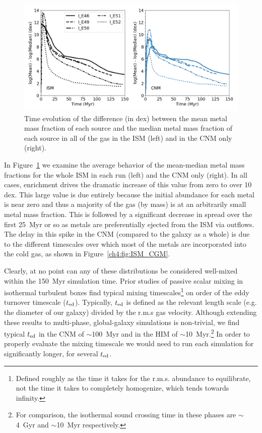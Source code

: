 \begin{figure}
  \centering
  \includegraphics[width=0.975\linewidth]{figures/ch4/ISM_CNM_average_mean-median}
  \caption{Time evolution of the difference (in dex) between the mean metal mass fraction of each source and the median metal mass fraction of each source in all of the gas in the ISM (left) and in the CNM only (right).}
  \label{ch4:fig:mean-median}
\end{figure}

In Figure~\ref{ch4:fig:mean-median} we examine the average behavior of the mean-median metal mass fractions for the whole ISM in each run (left) and the CNM only (right). In all cases, enrichment drives the dramatic increase of this value from zero to over 10 dex. This large value is due entirely because the initial abundance for each metal is near zero and thus a majority of the gas (by mass) is at an arbitrarily small metal mass fraction. This is followed by a significant decrease in spread over the first 25~Myr or so as metals are preferentially ejected from the ISM via outflows. The delay in this spike in the CNM (compared to the galaxy as a whole) is due to the different timescales over which most of the metals are incorporated into the cold gas, as shown in Figure~\ref{ch4:fig:ISM_CGM}.

Clearly, at no point can any of these distributions be considered well-mixed within the 150~Myr simulation time. Prior studies of passive scalar mixing in isothermal turbulent boxes find typical mixing timescales\footnote{Defined roughly as the time it takes for the r.m.s. abundance to equilibrate, not the time it takes to completely homogenize, which tends towards infinity.} on order of the eddy turnover timescale \citep[e.g.][]{SurPanScannapieco2014} ($t_{\rm ed}$). Typically, $t_{\rm ed}$ is defined as the relevant length scale (e.g. the diameter of our galaxy) divided by the r.m.s gas velocity. Although extending these results to multi-phase, global-galaxy simulations is non-trivial, we find typical $t_{\rm ed}$ in the CNM of $\sim$100~Myr and in the HIM of $\sim$10~Myr.\footnote{For comparison, the isothermal sound crossing time in these phases are $\sim$4~Gyr and $\sim$10~Myr respectively.} In order to properly evaluate the mixing timescale we would need to run each simulation for significantly longer, for several $t_{\rm ed}$.

